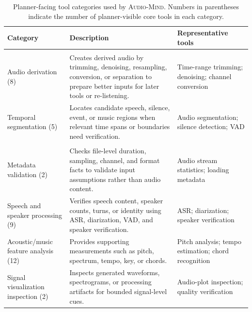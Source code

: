 \documentclass[11pt]{article}
\newcommand{\ours}{\textsc{Audio-Mind}}
\begin{document}
\begin{table}[t]
\small
\centering
\renewcommand{\arraystretch}{1.08}
\setlength{\heavyrulewidth}{0.1em}
\setlength{\lightrulewidth}{0.055em}
\setlength{\cmidrulewidth}{0.035em}
\begin{tabularx}{\textwidth}{>{\raggedright\arraybackslash}p{}>{\raggedright\arraybackslash}X>{\raggedright\arraybackslash}p{}}
\toprule
\textbf{Category} & \textbf{Description} & \textbf{Representative tools} \\
\midrule
\multicolumn{3}{c}{\textbf{Transformation tools}} \\
\cmidrule(lr){1-3}
Audio derivation (8) & Creates derived audio by trimming, denoising, resampling, conversion, or separation to prepare better inputs for later tools or re-listening. & Time-range trimming; denoising; channel conversion \\
\cmidrule(lr){1-3}
Temporal segmentation (5) & Locates candidate speech, silence, event, or music regions when relevant time spans or boundaries need verification. & Audio segmentation; silence detection; VAD \\
\midrule
\multicolumn{3}{c}{\textbf{Perception tools}} \\
\cmidrule(lr){1-3}
Metadata validation (2) & Checks file-level duration, sampling, channel, and format facts to validate input assumptions rather than audio content. & Audio stream statistics; loading metadata \\
\cmidrule(lr){1-3}
Speech and speaker processing (9) & Verifies speech content, speaker counts, turns, or identity using ASR, diarization, VAD, and speaker verification. & ASR; diarization; speaker verification \\
\cmidrule(lr){1-3}
Acoustic/music feature analysis (12) & Provides supporting measurements such as pitch, spectrum, tempo, key, or chords. & Pitch analysis; tempo estimation; chord recognition \\
\cmidrule(lr){1-3}
Signal visualization inspection (2) & Inspects generated waveforms, spectrograms, or processing artifacts for bounded signal-level cues. & Audio-plot inspection; quality verification \\
\bottomrule
\end{tabularx}
\caption{Planner-facing tool categories used by \ours{}. Numbers in parentheses indicate the number of planner-visible core tools in each category. }
\label{tab:tool_categories}
\end{table}
\end{document}
